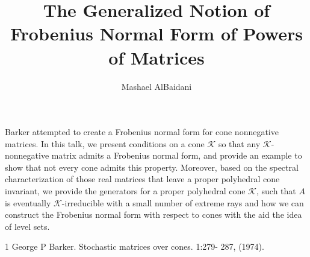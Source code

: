 \documentclass[a4paper]{amsart}
\date{}
\begin{document}
\title{The Generalized Notion of Frobenius Normal Form of Powers of Matrices}
\author{Mashael AlBaidani} %
\address{Prince Sattam Bin Abdulaziz University} %

\maketitle

 
  Barker \cite{barker1} attempted to create a Frobenius normal form for cone nonnegative matrices. In this talk, we present conditions on a cone $\mathcal{K}$ so that any $\mathcal{K}$-nonnegative matrix admits a Frobenius normal form, and provide an example to show that not every cone admits this property. Moreover, based on the spectral characterization of those real matrices that leave a proper polyhedral cone invariant, we provide the generators for a proper polyhedral cone $\mathcal{K}$, such that $A$ is eventually $\mathcal{K}$-irreducible with a small number of extreme rays and how we can construct the Frobenius normal form with respect to cones with the aid the idea of level sets.
  




\begin{thebibliography}{1}
George P Barker.
\newblock Stochastic matrices over cones.
  1:279- 287,  (1974).


\end{thebibliography}
\end{document}
